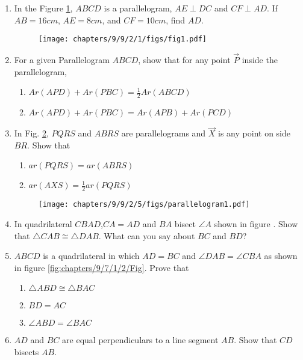 \begin{enumerate}[label=\thesection.\arabic*,ref=\thesection.\theenumi]
\item In the Figure \ref{fig:9/9/2/1}, $ABCD$ is a parallelogram, $AE \perp DC$ and $CF \perp AD$. If $AB = 16 cm$, $AE = 8 cm$, and $CF = 10cm$, find $AD$.
	\begin{figure}[!h]
		\centering
 \texttt{[image: chapters/9/9/2/1/figs/fig1.pdf]}
		\caption{}
		\label{fig:9/9/2/1}
  	\end{figure}

\item For a given Parallelogram $ABCD$, show that for any
point $\vec{P}$ inside the parallelogram,
\begin{enumerate}
	\item $Ar(APD)+Ar(PBC) = \frac{1}{2}Ar(ABCD)$
	\item $Ar(APD)+Ar(PBC) = Ar(APB)+Ar(PCD)$
\end{enumerate}

\item In Fig.
		\ref{fig:9/9/2/5},
$PQRS$ and $ABRS$ are parallelograms
and $\vec{X}$ is any point on side $BR$. Show that  
\begin{enumerate}
    \item $ar (PQRS) = ar(ABRS)$
	    \label{prop:9/9/2/5}
    \item $ar(AXS) = \frac{1}{2} ar(PQRS)$
\end{enumerate}
	\begin{figure}[!h]
		\centering
 \texttt{[image: chapters/9/9/2/5/figs/parallelogram1.pdf]}
		\caption{}
		\label{fig:9/9/2/5}
  	\end{figure}

%	
\item In quadrilateral $CBAD$,$CA = AD$ and $BA$ bisect $\angle{A}$ shown in figure . Show that $\triangle{CAB} \cong \triangle{DAB}$. What can you say about $BC$ and $BD$? \\
	\solution

\item $ABCD$ is a quadrilateral in which $AD = BC$ and $\angle{DAB} = \angle{CBA}$ as shown in figure \ref{fig:chapters/9/7/1/2/Fig}. Prove that
\begin{enumerate}
\item $\triangle{ABD} \cong \triangle{BAC}$
  \item $BD = AC$
  \item $\angle{ABD} = \angle{BAC}$
\end{enumerate}
	\solution

\item $AD$ and $BC$ are equal perpendiculars to a line segment $AB$. Show that $CD$ bisects $AB$.\\
	\solution




\end{enumerate}
